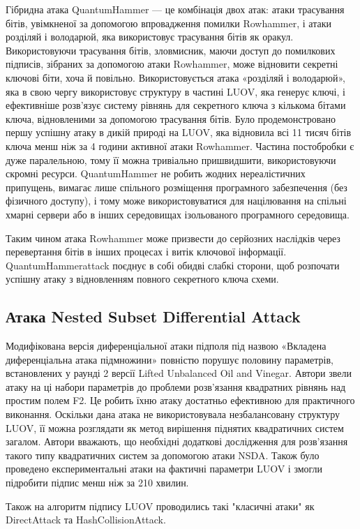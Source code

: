 Гібридна атака QuantumHammer --- це комбінація двох атак: атаки трасування бітів, увімкненої за допомогою впровадження помилки Rowhammer, і атаки розділяй і володарюй, яка використовує трасування бітів як оракул. Використовуючи трасування бітів, зловмисник, маючи доступ до помилкових підписів, зібраних за допомогою атаки Rowhammer, може відновити секретні ключові біти, хоча й повільно. Використовується атака «розділяй і володарюй», яка в свою чергу використовує структуру в частині LUOV, яка генерує ключі, і ефективніше розв’язує систему рівнянь для секретного ключа з кількома бітами ключа, відновленими за допомогою трасування бітів. Було продемонстровано першу успішну атаку в дикій природі на LUOV, яка відновила всі 11 тисяч бітів ключа менш ніж за 4 години активної атаки Rowhammer. Частина постобробки є дуже паралельною, тому її можна тривіально пришвидшити, використовуючи скромні ресурси. QuantumHammer не робить жодних нереалістичних припущень, вимагає лише спільного розміщення програмного забезпечення (без фізичного доступу), і тому може використовуватися для націлювання на спільні хмарні сервери або в інших середовищах ізольованого програмного середовища.

Таким чином атака Rowhammer може призвести до серйозних наслідків через перевертання бітів в інших процесах і витік ключової інформації. QuantumHammerattack поєднує в собі обидві слабкі сторони, щоб розпочати успішну атаку з відновленням повного секретного ключа схеми.

\subsection{Атака Nested Subset Differential Attack}

Модифікована версія диференціальної атаки підполя під назвою «Вкладена диференціальна атака підмножини» повністю порушує половину параметрів, встановлених у раунді 2 версії Lifted Unbalanced Oil and Vinegar. Автори звели атаку на ці набори параметрів до проблеми розв’язання квадратних рівнянь над простим полем F2. Це робить їхню атаку достатньо ефективною для практичного виконання. Оскільки дана атака не використовувала незбалансовану структуру LUOV, її можна розглядати як метод вирішення піднятих квадратичних систем загалом. Автори вважають, що необхідні додаткові дослідження для розв’язання такого типу квадратичних систем за допомогою атаки NSDA. Також було проведено експериментальні атаки на фактичні параметри LUOV і змогли підробити підпис менш ніж за 210 хвилин.

Також на алгоритм підпису LUOV проводились такі "класичні атаки" як DirectAttack та HashCollisionAttack.